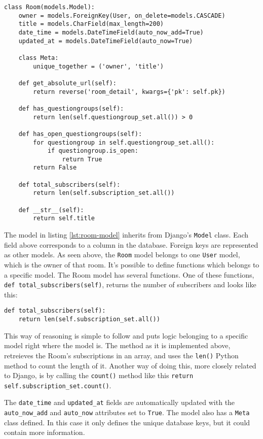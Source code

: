 \begin{lstlisting}[caption=The Room model, label=lst:room-model]
class Room(models.Model):
    owner = models.ForeignKey(User, on_delete=models.CASCADE)
    title = models.CharField(max_length=200)
    date_time = models.DateTimeField(auto_now_add=True)
    updated_at = models.DateTimeField(auto_now=True)

    class Meta:
        unique_together = ('owner', 'title')

    def get_absolute_url(self):
        return reverse('room_detail', kwargs={'pk': self.pk})

    def has_questiongroups(self):
        return len(self.questiongroup_set.all()) > 0

    def has_open_questiongroups(self):
        for questiongroup in self.questiongroup_set.all():
            if questiongroup.is_open:
                return True
        return False

    def total_subscribers(self):
        return len(self.subscription_set.all())

    def __str__(self):
        return self.title
\end{lstlisting}


The model in listing \ref{lst:room-model} inherits from Django's \texttt{Model} class. Each field above corresponds to a column in the database. Foreign keys are represented as other models. As seen above, the \texttt{Room} model belongs to one \texttt{User} model, which is the owner of that room. 
It's possible to define functions which belongs to a specific model. The Room model has several functions. One of these functions, \texttt{def total\_subscribers(self)}, returns the number of subscribers and looks like this:

\begin{lstlisting}[caption=The total subscribers method, label=lst:total-subscribers-method]
def total_subscribers(self):
    return len(self.subscription_set.all())
\end{lstlisting}
This way of reasoning is simple to follow and puts logic belonging to a specific model right where the model is. The method as it is implemented above, retreieves the Room's subscriptions in an array, and uses the \texttt{len()} Python method to count the length of it. Another way of doing this, more closely related to Django, is by calling the \texttt{count()} method like this \texttt{return self.subscription\_set.count()}.

The \texttt{date\_time} and \texttt{updated\_at} fields are automatically updated with the \texttt{auto\_now\_add} and \texttt{auto\_now} attributes set to \texttt{True}. The model also has a \texttt{Meta} class defined. In this case it only defines the unique database keys, but it could contain more information.

